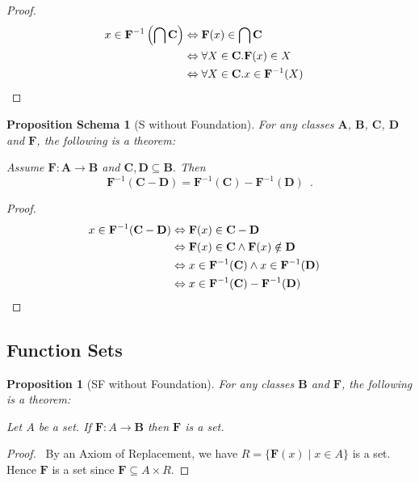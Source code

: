 \documentclass{book}
\let\qed\relax
\newtheorem{prop}[ax]{Proposition}
\newtheorem{props}[ax]{Proposition Schema}
\theoremstyle{definition}
\begin{document}
\begin{proof}
\pf
\begin{align*}
x \in \mathbf{F}^{-1} \left( \bigcap \mathbf{C} \right)
& \Leftrightarrow \mathbf{F}(x) \in \bigcap \mathbf{C} \\
& \Leftrightarrow \forall X \in \mathbf{C}. \mathbf{F}(x) \in X \\
& \Leftrightarrow \forall X \in \mathbf{C}. x \in \mathbf{F}^{-1}(X) & \qed
\end{align*}
\end{proof}

\begin{props}[S without Foundation]
For any classes $\mathbf{A}$, $\mathbf{B}$, $\mathbf{C}$, $\mathbf{D}$ and $\mathbf{F}$, the following is a theorem:

Assume $\mathbf{F} : \mathbf{A} \rightarrow \mathbf{B}$ and $\mathbf{C}, \mathbf{D} \subseteq \mathbf{B}$. Then
\[ \mathbf{F}^{-1}(\mathbf{C} - \mathbf{D}) = \mathbf{F}^{-1}(\mathbf{C}) - \mathbf{F}^{-1}(\mathbf{D}) \enspace . \]
\end{props}

\begin{proof}
\pf
\begin{align*}
x \in \mathbf{F}^{-1}(\mathbf{C} - \mathbf{D}) & \Leftrightarrow \mathbf{F}(x) \in \mathbf{C} - \mathbf{D} \\
& \Leftrightarrow \mathbf{F}(x) \in \mathbf{C} \wedge \mathbf{F}(x) \notin \mathbf{D} \\
& \Leftrightarrow x \in \mathbf{F}^{-1}(\mathbf{C}) \wedge x \in \mathbf{F}^{-1}(\mathbf{D}) \\
& \Leftrightarrow x \in \mathbf{F}^{-1}(\mathbf{C}) - \mathbf{F}^{-1}(\mathbf{D}) & \qed
\end{align*}
\end{proof}

\subsection{Function Sets}

\begin{prop}[SF without Foundation]
For any classes $\mathbf{B}$ and $\mathbf{F}$, the following is a theorem:

Let $A$ be a set. If $\mathbf{F} : A \rightarrow \mathbf{B}$ then $\mathbf{F}$ is a set.
\end{prop}

\begin{proof}
\pf\ By an Axiom of Replacement, we have $R = \{ \mathbf{F}(x) \mid x \in A \}$ is a set. Hence $\mathbf{F}$ is a set since $\mathbf{F} \subseteq A \times R$. \qed
\end{proof}
\end{document}

